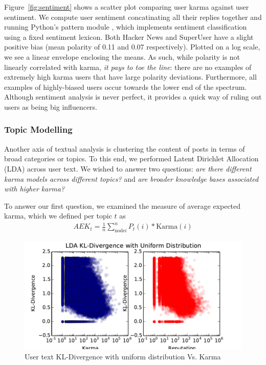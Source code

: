\documentclass[11pt]{article}
\begin{document}
Figure~\ref{fig:sentiment} shows a scatter plot comparing user karma
against user sentiment. We compute user sentiment concatinating all
their replies together and running Python's pattern module \citet{de2012pattern}, 
which implements sentiment classification using a fixed sentiment lexicon.  Both
Hacker News and SuperUser have a slight positive bias (mean polarity of 0.11 and
0.07 respectively). Plotted on a log scale, we see a linear envelope enclosing
the means. As such, while polarity is not linearly correlated with karma,
\textit{it pays to toe the line}: there are no examples of extremely high karma
users that have large polarity deviations. Furthermore, all examples of
highly-biased users occur towards the lower end of the spectrum. Although
sentiment analysis is never perfect, it provides a quick way of ruling out users
as being big influencers.

\subsubsection{Topic Modelling}
Another axis of textual analysis is clustering the content of posts in terms of
broad categories or topics. To this end, we performed Latent Dirichlet
Allocation (LDA) \cite{blei2003latent} across user text. We wished to answer two
questions: \textit{are there different karma models across different topics?}
and \textit{are broader knowledge bases associated with higher karma?}

To answer our first question, we examined the measure of average expected karma,
which we defined per topic $t$ as
\begin{align*}
AEK_t = \frac{1}{n} \sum_{\text{node} i}^n P_t(i) * \text{Karma}(i)
\end{align*}


\begin{figure}[h]
\centering
\includegraphics[width=\linewidth]{lda_kl}
\caption{User text KL-Divergence with uniform distribution Vs. Karma}
\label{fig:lda_kl}
\end{figure}
\end{document}
